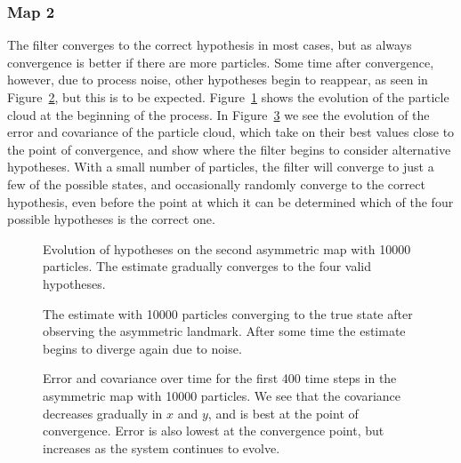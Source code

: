 \documentclass[a4paper,12pt]{article}
\begin{document}
\subsubsection{Map 2}
The filter converges to the correct hypothesis in most cases, but as always
convergence is better if there are more particles. Some time after convergence,
however, due to process noise, other hypotheses begin to reappear, as seen in
Figure~\ref{fig:hypconv}, but this is to be expected. Figure~\ref{fig:hypm2}
shows the evolution of the particle cloud at the beginning of the process. In
Figure~\ref{fig:hyperr} we see the evolution of the error and covariance of the
particle cloud, which take on their best values close to the point of
convergence, and show where the filter begins to consider alternative
hypotheses. With a small number of particles, the filter will converge to just a
few of the possible states, and occasionally randomly converge to the correct
hypothesis, even before the point at which it can be determined which of the
four possible hypotheses is the correct one.
\begin{figure}
  \caption{Evolution of hypotheses on the second asymmetric map with 10000
    particles. The estimate gradually converges to the four valid hypotheses.}
  \label{fig:hypm2}
\end{figure}
\begin{figure}
  \centering
  \caption{The estimate with 10000 particles converging to the true state after
    observing the asymmetric landmark. After some time the estimate begins to
    diverge again due to noise.}
  \label{fig:hypconv}
\end{figure}
\begin{figure}
  \centering
  \caption{Error and covariance over time for the first 400 time steps in the
    asymmetric map with 10000 particles. We see that the covariance decreases
    gradually in $x$ and $y$, and is best at the point of convergence. Error is
    also lowest at the convergence point, but increases as the system continues
    to evolve. }
  \label{fig:hyperr}
\end{figure}
\end{document}
